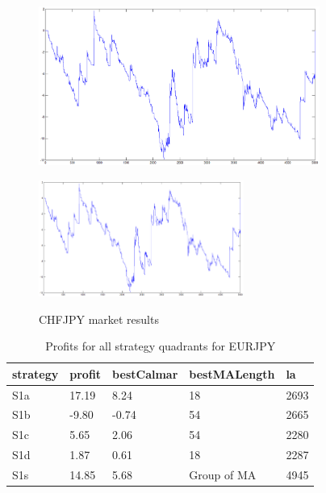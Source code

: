 \documentclass{tewiart}
\begin{document}
\begin{figure}[h]
\begin{minipage}{.49\linewidth}
\end{minipage}
\begin{minipage}{.49\linewidth}
\centering
\includegraphics[width=0.82\textwidth]{images/chfjpyD.eps}
\label{mansard}
\end{minipage}
\begin{minipage}{\linewidth}
\centering
\includegraphics[width=0.6\textwidth]{images/chfjpyS.eps}
\label{mansard}
\end{minipage}
\caption{CHFJPY market results}
\end{figure}
\FloatBarrier
\newpage
\begin{table}[!t]
\caption{Profits for all strategy quadrants for EURJPY}
 \begin{center}
 \begin{tabular}{|l|l|l|l|l|}
 \hline \textbf{strategy} & \textbf{profit} & \textbf{bestCalmar} & \textbf{bestMALength} & \textbf{la} \\ \hline
S1a & 17.19 & 8.24 & 18 & 2693\\ \hline
S1b & -9.80 & -0.74 & 54 & 2665\\ \hline
S1c & 5.65 & 2.06 & 54 & 2280\\ \hline
S1d & 1.87 & 0.61 & 18 & 2287\\ \hline
S1s & 14.85 & 5.68 & Group of MA & 4945\\
\hline \end{tabular}
 \end{center}
 \end{table}
\end{document}
